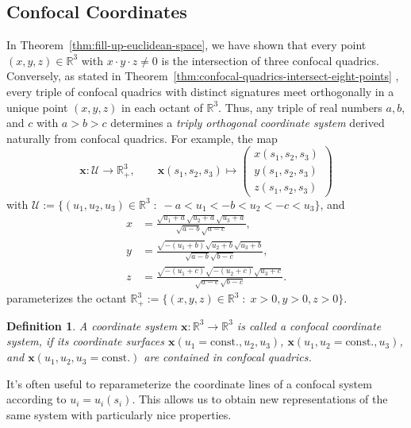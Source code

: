 \documentclass[10pt, a4paper]{article}
\theoremstyle{BoldTopSpacing}
\theoremstyle{BoldTopSpacing}
\theoremstyle{BoldTopSpacing}
\theoremstyle{BoldTopBottomSpacing}
\newtheorem{definition}{Definition}[section]
\theoremstyle{BoldTopSpacing}
\theoremstyle{BoldTopBottomSpacing}
\theoremstyle{remark}
\begin{document}
\subsection{Confocal Coordinates}
\label{subsec:confocal-coordinates}
In Theorem~\ref{thm:fill-up-euclidean-space}, we have shown that every point $(x, y, z) \in \mathbb{R}^3$ with $x \cdot y \cdot z \neq 0$ is the intersection of three confocal quadrics. Conversely, as stated in Theorem~\ref{thm:confocal-quadrics-intersect-eight-points}
, every triple of confocal quadrics with distinct signatures meet orthogonally in a unique point $(x, y, z)$ in each octant of $\mathbb{R}^3$. Thus, any triple of real numbers $a, b$, and $c$ with $a > b > c$ determines a \textit{triply orthogonal coordinate system} derived naturally from confocal quadrics. For example, the map
\[
\boldsymbol{x} :  \mathcal{U} \to \mathbb{R}_{+}^3, \quad \quad \boldsymbol{x}(s_{1}, s_{2}, s_{3}) \mapsto \begin{pmatrix}
x(s_{1}, s_{2}, s_{3}) \\
y(s_{1}, s_{2}, s_{3}) \\
z(s_{1}, s_{2}, s_{3})
\end{pmatrix}
\]
with $\mathcal{U} := \{ (u_{1}, u_{2}, u_{3}) \in \mathbb{R}^3 \; : \; -a < u_{1} < -b < u_{2} < -c < u_{3}\}$, and
\begin{align*}
x &= \frac{\sqrt{u_{1} + a}\sqrt{u_{2} + a}\sqrt{u_{3} + a }}{\sqrt{a-b}\sqrt{a-c}}, \\
y &= \frac{\sqrt{-(u_{1} + b)}\sqrt{u_{2} + b}\sqrt{u_{3} + b}}{\sqrt{a-b}\sqrt{b-c}}, \\
z &= \frac{\sqrt{-(u_{1} + c)}\sqrt{-(u_{2} + c)}\sqrt{u_{3} + c}}{\sqrt{a-c}\sqrt{b-c}}.
\end{align*}
parameterizes the octant $\mathbb{R}_{+}^3 := \{ (x, y, z)\in \mathbb{R}^3 \; : \; x > 0, y > 0, z > 0 \}$.

\begin{definition}
\label{def:confocal-coordinates}
A coordinate system $\boldsymbol{x} : \mathbb{R}^3 \to \mathbb{R}^3$ is called a \textit{confocal coordinate system}, if its coordinate surfaces $\boldsymbol{x}(u_{1}=\text{const.}, u_{2}, u_{3})$, $\boldsymbol{x}(u_{1}, u_{2}=\text{const.}, u_{3})$, and $\boldsymbol{x}(u_{1}, u_{2}, u_{3}=\text{const.})$ are contained in confocal quadrics.
\end{definition}

It's often useful to reparameterize the coordinate lines of a confocal system according to $u_{i} = u_{i}(s_{i})$. This allows us to obtain new representations of the same system with particularly nice properties.
\end{document}
